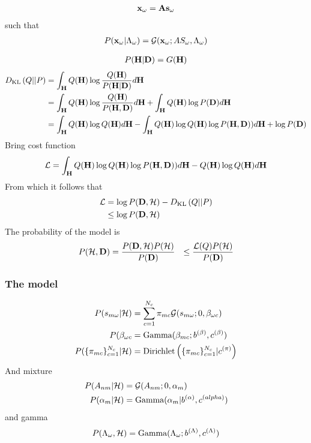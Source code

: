 {\begin{align}
  \mathbf{x}_\omega = \textbf{A} \mathbf{s}_\omega
\end{align}
such that
\begin{align}
  P(\mathbf{x}_\omega| \Lambda_\omega) = {\cal{G}}( \mathbf{x}_\omega ; AS_\omega, \Lambda_\omega)
\end{align}

\begin{align}
  P(\mathbf{H}|\mathbf{D}) = G(\mathbf{H})
\end{align}
\begin{align}
D_{\text {KL}}\left( {Q}||{P} \right) &= \int_{\mathbf{H}} Q(\mathbf{H}) \log\frac{Q(\mathbf{H})}{P(\mathbf{H}|\mathbf{D})} d\mathbf{H} \\
  &= \int_{\mathbf{H}} Q(\mathbf{H}) \log\frac{Q(\mathbf{H})}{P(\mathbf{H},\mathbf{D})} d\mathbf{H}  + \int_{\mathbf{H}} Q(\mathbf{H}) \log P(\mathbf{D}) d\mathbf{H}\\
  &= \int_{\mathbf{H}} Q(\mathbf{H}) \log Q(\mathbf{H}) d\mathbf{H} - \int_{\mathbf{H}} Q(\mathbf{H}) \log Q(\mathbf{H}) \log P(\mathbf{H},\mathbf{D}) ) d\mathbf{H} + \log P(\mathbf{D})
\end{align}
Bring cost function
\begin{align}
  {\cal L} =  \int_{\mathbf{H}} Q(\mathbf{H}) \log Q(\mathbf{H}) \log P(\mathbf{H},\mathbf{D}) ) d\mathbf{H} - Q(\mathbf{H}) \log Q(\mathbf{H}) d\mathbf{H} 
\end{align}
From which it follows that
\begin{align}
  {\cal L} &=   \log P(\mathbf{D},{\cal H}) - D_{\text {KL}}\left( {Q}||{P} \right) \\
     &\le \log P(\mathbf{D},{\cal H})
\end{align}
The probability of the model is 
\begin{align}
  P({\cal H}, \mathbf{D}) &=    \frac{P(\mathbf{D}, {\cal H}) P({\cal H})}{P(\mathbf{D})}
             &\le  \frac{{\cal L}(Q)P({\cal H})}{P(\mathbf{D})}
\end{align}


\subsubsection{The model}
\begin{align}
  P(s_{m\omega}| {\cal H}) &= \sum_{c=1}^{N_c} \pi_{mc}{\cal{G}}(s_{m\omega};0,\beta_{\omega c})\\
  P(\beta_{\omega c} &= \textrm{Gamma}(\beta_{mc} ; b^{(\beta)}, c^{(\beta)})\\
  P(\{\pi_{mc}\}_{c=1}^{N_c}|{\cal H})  &= \textrm{Dirichlet}\left(  \{\pi_{mc}\}_{c=1}^{N_c} | c^{(\pi)} \right)
\end{align}
And mixture
\begin{align}
  P(A_{nm}|{\cal H}) &= {\cal{G}}(A_{nm}; 0,\alpha_m)\\
  P(\alpha_m| {\cal H}) &= \textrm{Gamma}(\alpha_m| b^{(\alpha)},c^{(alpha)})
\end{align}
and gamma
\begin{align}
  P(\Lambda_{\omega},{\cal H}) = \textrm{Gamma}(\Lambda_\omega;b^{(\Lambda)},c^{(\Lambda)} )
\end{align}

}
